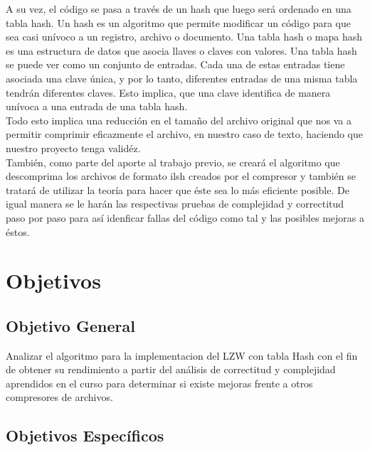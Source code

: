 \documentclass[letterpaper]{article}
\begin{document}
A su vez, el código se pasa a través de un hash que luego será ordenado en una tabla hash. Un hash es un algoritmo que permite modificar un código para que sea casi unívoco a un registro, archivo o documento. Una tabla hash o mapa hash es una estructura de datos que asocia llaves o claves con valores. Una tabla hash se puede ver como un conjunto de entradas. Cada una de estas entradas tiene asociada una clave única, y por lo tanto, diferentes entradas de una misma tabla tendrán diferentes claves. Esto implica, que una clave identifica de manera unívoca a una entrada de una tabla hash.\\

Todo esto implica una reducción en el tamaño del archivo original que nos va a permitir comprimir eficazmente el archivo, en nuestro caso de texto, haciendo que nuestro proyecto tenga validéz.\\

También, como parte del aporte al trabajo previo, se creará el algoritmo que descomprima los archivos de formato ilsh creados por el compresor y también se tratará de utilizar la teoría para hacer que éste sea lo más eficiente posible. De igual manera se le harán las respectivas pruebas de complejidad y correctitud paso por paso para así idenficar fallas del código como tal y las posibles mejoras a éstos.\\
\section{Objetivos}
\subsection{Objetivo General}

Analizar el algoritmo para la implementacion del LZW con tabla Hash con el fin de obtener su rendimiento a partir del análisis de correctitud y complejidad aprendidos en el curso para determinar si existe mejoras frente a otros compresores de archivos.

\subsection{Objetivos Específicos}
\end{document}
